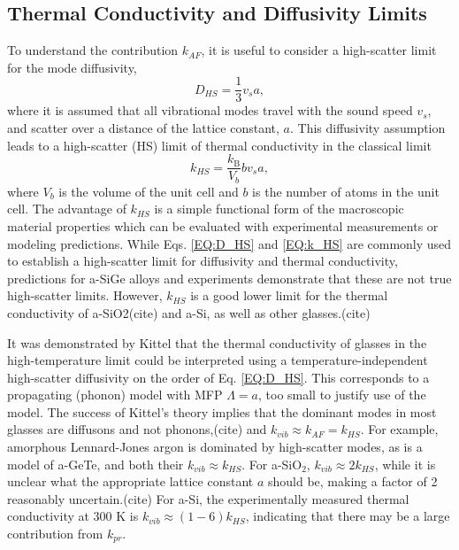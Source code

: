 \documentclass[aps,prb,twocolumn,superscriptaddress,footinbib,amsmath,amssymb,floatfix]{revtex4}
\begin{document}
\subsection{\label{S:Limits}Thermal Conductivity and Diffusivity Limits}

To understand the contribution $k_{AF}$, it is useful to consider a 
high-scatter limit for the mode diffusivity,
\begin{equation}\label{EQ:D_HS}
D_{HS} = \frac{1}{3} v_s a,
\end{equation}
where it is assumed that all vibrational modes travel with the sound speed  
$v_s$, and scatter over a distance of the lattice constant, $a$. This 
diffusivity assumption leads to a high-scatter (HS) limit of thermal 
conductivity in the classical limit\cite{cahill_lattice_1988} 
\begin{equation}\label{EQ:k_HS}
k_{HS} = \frac{k_{\text{B}}}{V_b}b v_s a,
\end{equation}
where $V_b$ is the volume of the unit cell and $b$ is the number of atoms 
in the unit cell.\cite{cahill_lower_1992} 
The advantage of $k_{HS}$ is a simple 
functional form of the macroscopic material properties which can 
be evaluated with experimental measurements or modeling predictions. 
While Eqs. \eqref{EQ:D_HS} and \eqref{EQ:k_HS} are commonly used to 
establish a high-scatter limit for 
diffusivity and thermal conductivity, predictions for a-SiGe alloys 
\cite{feldman_thermal_1993} and experiments 
demonstrate that these are not true high-scatter limits.  
However, $k_{HS}$ is a good lower limit for the thermal conductivity 
of a-SiO2(cite) and a-Si, as well as other glasses.(cite)

It was demonstrated by Kittel that  
the thermal conductivity of glasses in the high-temperature limit could 
be interpreted 
using a temperature-independent high-scatter diffusivity on the order 
of Eq. \eqref{EQ:D_HS}.\cite{kittel_interpretation_1949}  
This corresponds to a propagating (phonon) model with MFP $\Lambda = a$, 
too small to justify use of the model. The success of Kittel's theory 
implies that the dominant 
modes in most glasses are diffusons and not phonons,(cite) and  
$k_{vib} \approx k_{AF} = k_{HS}$. 
For example, amorphous Lennard-Jones argon is dominated 
by high-scatter modes,\cite{larkin_predicting_2013} as is a model of 
a-GeTe,\cite{sosso_thermal_2012} and both their $k_{vib} \approx k_{HS}$. 
For a-SiO$_2$, $k_{vib} \approx 2k_{HS}$, while it is unclear what the 
appropriate lattice constant $a$ should be, making a factor of 
2 reasonably uncertain.(cite) 
For a-Si, the experimentally measured thermal conductivity at 
300 K is $k_{vib} \approx (1-6) k_{HS}$,\cite{cahill_lower_1992}  
indicating that there may be a large contribution from $k_{pr}$.
\end{document}
